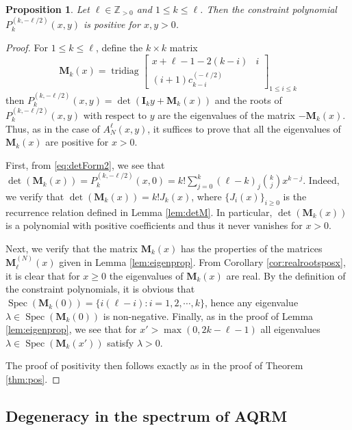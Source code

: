 \documentclass[11pt]{article}
\numberwithin{equation}{section}
\newcommand{\Z}{\mathbb{Z}} %
\newcommand{\cp}[2]{P^{(#1)}_{#2}} %
\DeclareMathOperator{\Spec}{Spec}
\DeclareMathOperator{\tridiag}{tridiag}
\newcommand{\Tridiag}[4]{\tridiag\mat{#1 & #2 \\ #3}_{#4}}
\newcommand{\mat}[1]{\begin{bmatrix}#1\end{bmatrix}}
\theoremstyle{plain}
\newtheorem{prop}[thm]{Proposition}
\theoremstyle{definition}
\theoremstyle{remark}
\begin{document}
\begin{prop} \label{prop:pos2}
  Let \(\ell \in \Z_{>0} \) and \( 1 \leq  k \leq \ell\). Then the constraint polynomial \( \cp{k,-\ell/2}{k}(x,y) \) is positive
  for \(x,y>0 \).
\end{prop}

\begin{proof}
  For \( 1 \leq k \leq \ell \), define the \(k \times k\) matrix
  \begin{equation*}
    \mathbf{M}_k(x) = \Tridiag{x+\ell-1-2(k-i)}{i}{(i+1)c^{(-\ell/2)}_{k-i}}{1 \le i \le k}
  \end{equation*}
  then \( \cp{k,-\ell/2}{k}(x,y) =  \det(\mathbf{I}_k y + \mathbf{M}_k(x)) \) and the roots of \(\cp{k,-\ell/2}{k}(x,y) \)
  with respect to \(y\) are the eigenvalues of the matrix \(-\mathbf{M}_k(x)\). Thus, as in the case of \(A_N^{\ell}(x,y)\), it
  suffices to prove that all the eigenvalues of \(\mathbf{M}_k(x)\) are positive for \(x >0\).

  First, from \eqref{eq:detForm2}, we see that \( \det(\mathbf{M}_k(x)) = \cp{k,-\ell/2}{k}(x,0) = k! \sum_{j=0}^k (\ell-k)_j \binom{k}{j} x^{k-j}\).
  Indeed, we verify that \( \det(\mathbf{M}_k(x)) = k! J_k(x)\), where \(\{ J_i(x)\}_{i \geq 0} \) is the recurrence relation defined
  in Lemma \ref{lem:detM}. In particular, \(\det(\mathbf{M}_k(x)) \) is a polynomial with positive coefficients and thus it
  never vanishes for \(x >0 \).

  Next, we verify that the matrix \(\mathbf{M}_k(x)\) has the properties of the matrices \(\mathbf{M}^{(N)}_\ell(x)\) given in Lemma
  \ref{lem:eigenprop}. From Corollary \ref{cor:realrootsposx}, it is clear that for \(x \geq 0\) the eigenvalues of
  \(\mathbf{M}_k(x)\) are real. By the definition of the constraint polynomials, it is obvious that
  \( \Spec(\mathbf{M}_k(0)) = \{ i(\ell-i) : i=1,2,\cdots,k \}\), hence any eigenvalue \(\lambda \in \Spec(\mathbf{M}_k(0)) \) is non-negative.
  Finally, as in the proof of Lemma \ref{lem:eigenprop}, we see that for \(x' > \max(0,2 k - \ell - 1)\) all eigenvalues
  \(\lambda \in \Spec(\mathbf{M}_k(x')) \) satisfy \(\lambda > 0 \).

  The proof of positivity then follows exactly as in the proof of Theorem \ref{thm:pos}. 
\end{proof}

  \subsection{Degeneracy in the spectrum of AQRM}
\label{sec:degen-eigenv-aqrm}
\end{document}
